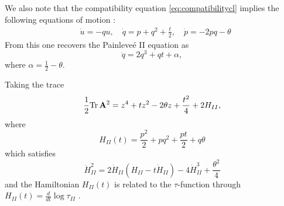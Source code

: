 \documentclass[a4paper,11pt]{article}
\numberwithin{equation}{section}
\begin{document}
We also note that the compatibility equation \eqref{eq:compatibilitycl} implies the following equations of motion : 
\begin{equation}
\begin{split}
&\dot{u} = -q u , \quad \dot{q} = p + q^2+ \frac{t}{2}, \quad \dot{p} = -2pq - \theta
\end{split}
\end{equation}
From this one recovers the Painleve\'e II equation as 
\begin{equation}
\label{eq:PIIscl}
\ddot{q} = 2q^3 + q t + \alpha,
\end{equation}
where $\alpha = \frac12 - \theta$.

Taking the trace 
\begin{equation}
\label{eq:spectralcurve}
\frac12{\mathrm{Tr}}\, {\bf{A}}^2
= z^4 + t z^2 - 2\theta z + \frac{t^2}{4} + 2H_{II},
\end{equation}
where 
\begin{equation}
\label{eq:Hamiltoniancl}
H_{II} (t) = \frac{p^2}{2} + pq^2 + \frac{pt}{2} + q\theta
\end{equation}
which satisfies 
\begin{equation}
\ddot{H}^2_{II} = 2\dot{H}_{II}(H_{II}- t\dot{H}_{II}) - 4\dot{H}^3_{II} + \frac{\theta^2}{4}
\end{equation}
and the Hamiltonian $H_{II}(t)$ is related to the $\tau$-function through $H_{II}(t) = \frac{d}{dt}\log\tau_{II}$ \cite{Bonelli:2016qwg}. 
\end{document}
